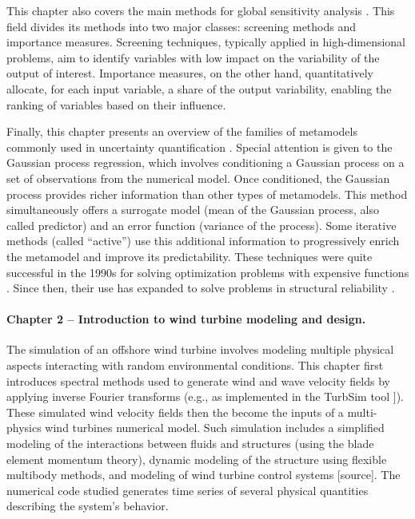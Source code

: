 This chapter also covers the main methods for global sensitivity analysis \citep{daveiga_iooss_2021}. 
This field divides its methods into two major classes: screening methods and importance measures. 
Screening techniques, typically applied in high-dimensional problems, aim to identify variables with low impact on the variability of the output of interest. 
Importance measures, on the other hand, quantitatively allocate, for each input variable, a share of the output variability, enabling the ranking of variables based on their influence.

Finally, this chapter presents an overview of the families of metamodels commonly used in uncertainty quantification \citep{forrester_2008}. 
Special attention is given to the Gaussian process regression, which involves conditioning a Gaussian process on a set of observations from the numerical model. 
Once conditioned, the Gaussian process provides richer information than other types of metamodels. 
This method simultaneously offers a surrogate model (mean of the Gaussian process, also called predictor) and an error function (variance of the process). 
Some iterative methods (called ``active'') use this additional information to progressively enrich the metamodel and improve its predictability. 
These techniques were quite successful in the 1990s for solving optimization problems with expensive functions \citep{jones_1998}. 
Since then, their use has expanded to solve problems in structural reliability \cite{echard_2011}.


\paragraph{Chapter 2 -- Introduction to wind turbine modeling and design.} 
The simulation of an offshore wind turbine involves modeling multiple physical aspects interacting with random environmental conditions. 
This chapter first introduces spectral methods used to generate wind and wave velocity fields by applying inverse Fourier transforms (e.g., as implemented in the TurbSim tool \citep{turbsim_2009}]). 
These simulated wind velocity fields then the become the inputs of a multi-physics wind turbines numerical model. 
Such simulation includes a simplified modeling of the interactions between fluids and structures (using the blade element momentum theory), dynamic modeling of the structure using flexible multibody methods, and modeling of wind turbine control systems [source]. 
The numerical code studied generates time series of several physical quantities describing the system's behavior.

